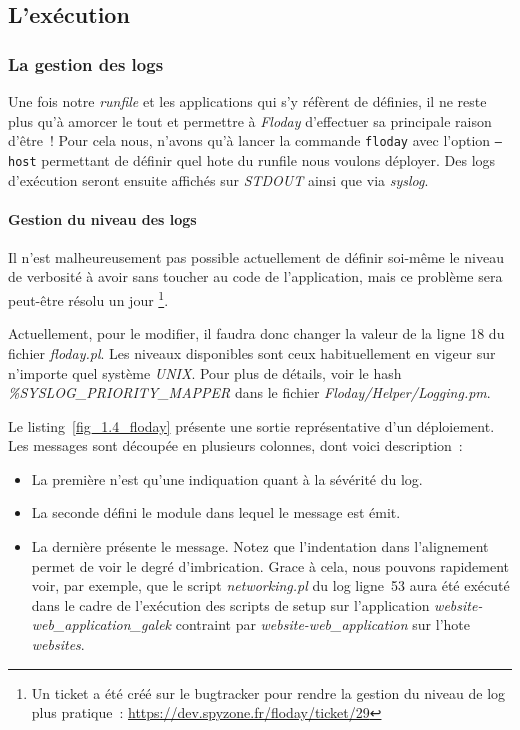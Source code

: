 \subsection{L'exécution}

\subsubsection{La gestion des logs}

Une fois notre \emph{runfile} et les applications qui s'y réfèrent de définies, il ne reste plus qu'à amorcer le tout et permettre à \emph{Floday} d'effectuer sa principale raison d'être~!
Pour cela nous, n'avons qu'à lancer la commande {\tt floday} avec l'option {\tt --host} permettant de définir quel \gls{hote} du runfile nous voulons déployer.
Des logs d'exécution seront ensuite affichés sur \emph{STDOUT} ainsi que via \emph{syslog}.

\paragraph{Gestion du niveau des logs}
Il n'est malheureusement pas possible actuellement de définir soi-même le niveau de verbosité à avoir sans toucher au code de l'application, mais ce problème sera peut-être résolu un jour%
\footnote{Un ticket a été créé sur le bugtracker pour rendre la gestion du niveau de log plus pratique~: \url{https://dev.spyzone.fr/floday/ticket/29}}.

Actuellement, pour le modifier, il faudra donc changer la valeur de la ligne 18 du fichier \emph{floday.pl}.
Les niveaux disponibles sont ceux habituellement en vigeur sur n'importe quel système \emph{UNIX}.
Pour plus de détails, voir le hash \emph{\%SYSLOG\_PRIORITY\_MAPPER} dans le fichier \emph{Floday/Helper/Logging.pm}.



Le listing~\ref{fig_1.4_floday} présente une sortie représentative d'un déploiement.
Les messages sont découpée en plusieurs colonnes, dont voici description~:
\begin{itemize}
	\item La première n'est qu'une indiquation quant à la sévérité du log.
	\item La seconde défini le module dans lequel le message est émit.
	\item La dernière présente le message. Notez que l'indentation dans l'alignement permet de voir le degré d'imbrication. Grace à cela, nous pouvons rapidement voir, par exemple, que le script \emph{networking.pl} du log ligne~53 aura été exécuté dans le cadre de l'exécution des scripts de setup sur l'\gls{application} \emph{website-web\_application\_galek} contraint par \emph{website-web\_application} sur l'\gls{hote} \emph{websites}.
\end{itemize}

